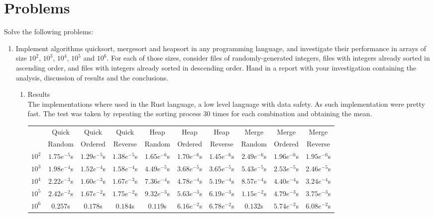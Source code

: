 \documentclass{article}
\begin{document}
\section{Problems}
Solve the following problems:
\begin{enumerate}
    \item Implement algorithms quicksort, mergesort and heapsort in any programming language, and investigate their performance in arrays of size $10^2$, $10^3$, $10^4$, $10^5$ and $10^6$. For each of those sizes, consider files of  randomly-generated  integers,  files  with  integers  already  sorted  in  ascending  order,  and  files  with integers already sorted in descending order. Hand in a report with your investigation containing the analysis, discussion of results and the conclusions.
    \begin{enumerate}
        \item Results\\
        The implementations where used in the Rust language, a low level language with data safety. As such implementation were pretty fast.
        The test was taken by repeating the sorting process 30 times for each combination and obtaining the mean.\\
        \begin{tabular}{|c|c|c|c|c|c|c|c|c|c|}
            \hline
            &Quick &Quick &Quick &Heap &Heap &Heap &Merge &Merge &Merge\\
            &Random &Ordered &Reverse &Random &Ordered &Reverse &Random &Ordered &Reverse\\
            \hline
            $10^2$& $1.75e^{-5}$s & $1.29e^{-5}$s & $1.38e^{-5}$s & $1.65e^{-6}$s & $1.70e^{-6}$s & $1.45e^{-6}$s & $2.49e^{-6}$s & $1.96e^{-6}$s & $1.95e^{-6}$s\\
            $10^3$& $1.98e^{-4}$s & $1.52e^{-4}$s & $1.58e^{-4}$s & $4.49e^{-5}$s & $3.68e^{-5}$s & $3.65e^{-5}$s & $5.43e^{-5}$s & $2.53e^{-5}$s & $2.46e^{-5}$s\\
            $10^4$& $2.22e^{-3}$s & $1.60e^{-3}$s & $1.67e^{-3}$s & $7.36e^{-4}$s & $4.78e^{-4}$s & $5.19e^{-4}$s & $8.57e^{-4}$s & $4.40e^{-4}$s & $3.24e^{-4}$s\\
            $10^5$& $2.42e^{-2}$s & $1.67e^{-2}$s & $1.75e^{-2}$s & $9.32e^{-3}$s & $5.63e^{-3}$s & $6.19e^{-3}$s & $1.15e^{-2}$s & $4.79e^{-3}$s & $3.75e^{-3}$s\\
            $10^6$& $0.257$s      & $0.178$s      & $0.184$s      & $0.119$s      & $6.16e^{-2}$s & $6.78e^{-2}$s & $0.132$s      & $5.74e^{-2}$s & $6.08e^{-2}$s\\
            \hline
        \end{tabular}


\end{enumerate}
\end{enumerate}
\end{document}
